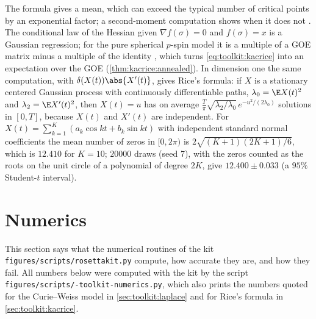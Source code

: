 \begin{refsection}
The formula gives a mean, which can exceed the typical number of critical points by an exponential factor; a second-moment computation shows when it does not \parencite{Subag2017a}. The conditional law of the Hessian given $\nabla f(\sigma)=0$ and $f(\sigma)=x$ is a Gaussian regression; for the pure spherical $p$-spin model it is a multiple of a GOE matrix minus a multiple of the identity \parencite[Lemma~3.2]{AuffingerBenArousCerny2013}, which turns \eqref{eq:toolkit:kacrice} into an expectation over the GOE (\cref{thm:kacrice:annealed}). In dimension one the same computation, with $\delta(X(t))\abs{X'(t)}$, gives Rice's formula: if $X$ is a stationary centered Gaussian process with continuously differentiable paths, $\lambda_0=\E X(t)^2$ and $\lambda_2=\E X'(t)^2$, then $X(t)=u$ has on average $\frac T\pi\sqrt{\lambda_2/\lambda_0}\,e^{-u^2/(2\lambda_0)}$ solutions in $[0,T]$, because $X(t)$ and $X'(t)$ are independent. For $X(t)=\sum_{k=1}^K(a_k\cos kt+b_k\sin kt)$ with independent standard normal coefficients the mean number of zeros in $[0,2\pi)$ is $2\sqrt{(K+1)(2K+1)/6}$, which is $12.410$ for $K=10$; $20000$ draws (seed 7), with the zeros counted as the roots on the unit circle of a polynomial of degree $2K$, give $12.400\pm0.033$ (a $95\%$ Student-$t$ interval).

\section{Numerics}\label{sec:toolkit:numerics}

This section says what the numerical routines of the kit \texttt{figures/\allowbreak scripts/\allowbreak rosettakit.py} compute, how accurate they are, and how they fail. All numbers below were computed with the kit by the script \texttt{figures/\allowbreak scripts/-toolkit-numerics.py}, which also prints the numbers quoted for the Curie--Weiss model in \cref{sec:toolkit:laplace} and for Rice's formula in \cref{sec:toolkit:kacrice}.


\end{refsection}
